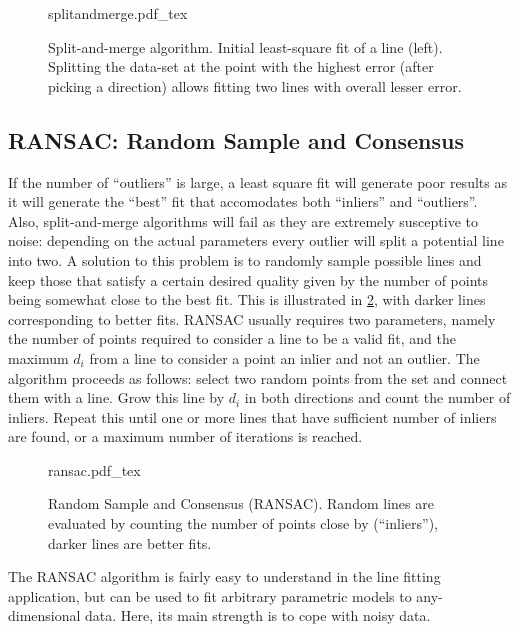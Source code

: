 \begin{figure}
    \def\svgwidth{\textwidth}
    {splitandmerge.pdf_tex}
    \caption{Split-and-merge algorithm. Initial least-square fit of a line (left). Splitting the data-set at the point with the highest error (after picking a direction) allows fitting two lines with overall lesser error.\label{fig:splitandmerge}}
\end{figure}

\subsection{RANSAC: Random Sample and Consensus}
If the number of ``outliers'' is large, a least square fit will generate poor results as it will generate the ``best'' fit that accomodates both ``inliers'' and ``outliers''. Also, split-and-merge algorithms will fail as they are extremely susceptive to noise: depending on the actual parameters every outlier will split a potential line into two. A solution to this problem is to randomly sample possible lines and keep those that satisfy a certain desired quality given by the number of points being somewhat close to the best fit. This is illustrated in \cref{fig:ransac}, with darker lines corresponding to better fits. RANSAC usually requires two parameters, namely the number of points required to consider a line to be a valid fit, and the maximum $d_i$ from a line to consider a point an inlier and not an outlier. The algorithm proceeds as follows: select two random points from the set and connect them with a line. Grow this line by $d_i$ in both directions and count the number of inliers. Repeat this until one or more lines that have sufficient number of inliers are found, or a maximum number of iterations is reached.

\begin{figure}
    \center
    \def\svgwidth{0.6\textwidth}
    {ransac.pdf_tex}
    \caption{Random Sample and Consensus (RANSAC). Random lines are evaluated by counting the number of points close by (``inliers''), darker lines are better fits.\label{fig:ransac}}
\end{figure}

The RANSAC algorithm is fairly easy to understand in the line fitting application, but can be used to fit arbitrary parametric models to any-dimensional data. Here, its main strength is to cope with noisy data.

